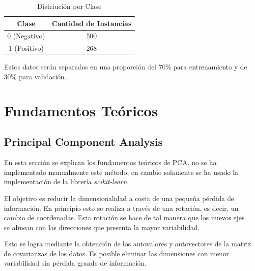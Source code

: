 \documentclass[letter, titlepage, 10pt]{article}
\begin{document}
\begin{table}[H]
\centering
\begin{tabular}{|c|c|}
\hline
\textbf{Clase} & \textbf{Cantidad de Instancias} \\ \hline
0 (Negativo)   & 500                             \\ \hline
1 (Positivo)   & 268                             \\ \hline
\end{tabular}
\caption{Distriución por Clase}
\end{table}

Estos datos serán separados en una proporción del 70\% para entrenamiento y de 30\% para validación. 


\newpage

\section{Fundamentos Teóricos}

\subsection{Principal Component Analysis}
En esta sección se explican los fundamentos teóricos de PCA, no se ha implementado manualmente este método, en cambio solamente se ha usado la implementación de la librería \textit{scikit-learn}.

El objetivo es reducir la dimensionalidad a costa de una pequeña pérdida de información. En principio esto se realiza a través de una rotación, es decir, un cambio de coordenadas. Esta rotación se hace de tal manera que los nuevos ejes se alinean con las direcciones que presenta la mayor variabilidad.

Esto se logra mediante la obtención de los autovalores y autovectores de la matriz de covarianzas de los datos. Es posible eliminar las dimensiones con menor variabilidad sin pérdida grande de información.
\end{document}
